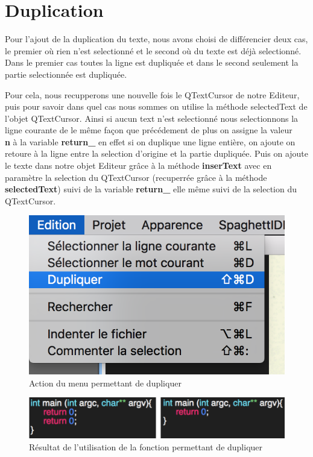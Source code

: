 \documentclass[a4paper,12pt]{article}
\begin{document}
\section{Duplication}

	Pour l'ajout de la duplication du texte, nous avons choisi de différencier deux cas, le premier où rien n'est selectionné et le second où du texte est déjà selectionné. Dans le premier cas toutes la ligne est dupliquée et dans le second seulement la partie selectionnée est dupliquée.

	Pour cela, nous recupperons une nouvelle fois le QTextCursor de notre Editeur, puis pour savoir dans quel cas nous sommes on utilise la méthode selectedText de l'objet QTextCursor. Ainsi si aucun text n'est selectionné nous selectionnons la ligne courante de le même façon que précédement de plus on assigne la valeur  \textbf{\\n} à la variable \textbf{return\_} en effet si on duplique une ligne entière, on ajoute on retoure à la ligne entre la selection d'origine et la partie dupliquée. Puis on ajoute le texte dans notre objet Editeur grâce à la méthode \textbf{inserText} avec en paramètre la selection du QTextCursor (recuperrée grâce à la méthode \textbf{selectedText}) suivi de la variable \textbf{return\_} elle même suivi de la selection du QTextCursor.

	\begin{figure}[h!]
		\begin{center}
			\includegraphics[scale=0.8]{imgs/utilisation_duplication}
			\caption{Action du menu permettant de dupliquer}
		\end{center}
	\end{figure}


	\begin{figure}[h!]
		\begin{center}
			\includegraphics[scale=0.8]{imgs/resultat_duplication}
			\caption{Résultat de l'utilisation de la fonction permettant de dupliquer}
		\end{center}
	\end{figure}
\end{document}
